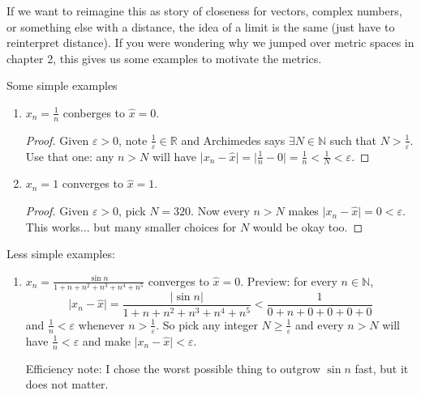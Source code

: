 \documentclass{article}
\theoremstyle{plain}
\theoremstyle{remark}
\newcommand{\N}{{\mathbb N}}
\newcommand{\R}{{\mathbb R}}
\newcommand{\ep}{{\varepsilon}}
\begin{document}
If we want to reimagine this as story of closeness for vectors,
complex numbers, or something else with a distance,
the idea of a limit is the same (just have to reinterpret distance).
If you were wondering why we jumped over metric spaces in chapter 2,
this gives us some examples to motivate the metrics.

Some simple examples
\begin{enumerate}
\item $x_n = \frac{1}{n}$ conberges to $\hat{x} = 0$.
\begin{proof}
	Given $\ep > 0$, note $\frac{1}{\ep} \in \R$ and Archimedes
	says $\exists N \in \N$ such that $N>\frac{1}{\ep}$.
	Use that one: any $n > N$ will have $\lvert x_n - \hat{x}\rvert
	= \lvert \frac{1}{n} - 0\rvert = \frac{1}{n} < \frac{1}{N} < \ep$.
\end{proof}
\item $x_n = 1$ converges to $\hat{x} = 1$.
\begin{proof}
	Given $\ep > 0$, pick $N = 320$.
	Now every $n > N$ makes $\lvert x_n - \hat{x} \rvert = 0 < \ep$.
	This works... but many smaller choices for $N$ would be okay too.
\end{proof}
\end{enumerate}

Less simple examples:
\begin{enumerate}
\item $x_n = \frac{\sin{n}}{1+n+n^2+n^3+n^4+n^5}$ converges to $\hat{x} = 0$.
Preview: for every $n \in \N$,
\[\lvert x_n - \hat{x} \rvert = \frac{\lvert\sin{n}\rvert}{1+n+n^2+n^3+n^4+n^5}
< \frac{1}{0+n+0+0+0+0}\]
and $\frac{1}{n} < \ep$ whenever $n > \frac{1}{\ep}$.
So pick any integer $N \geq \frac{1}{\ep}$ and every $n>N$
will have $\frac{1}{n} < \ep$ and make $\lvert x_n - \hat{x}\rvert < \ep$.

Efficiency note: I chose the worst possible thing to outgrow $\sin{n}$ fast,
but it does not matter.
\end{enumerate}
\end{document}
